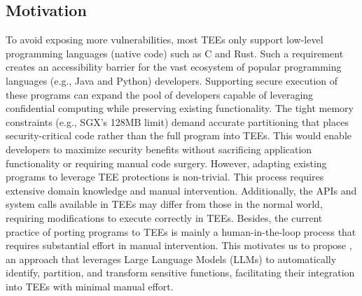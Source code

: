 \subsection{Motivation}
To avoid exposing more vulnerabilities, most TEEs only support low-level programming languages (native code) such as C and Rust. 
Such a requirement creates an accessibility barrier for the vast ecosystem of popular programming languages (e.g., Java and Python) developers. Supporting secure execution of these programs can expand the pool of developers capable of leveraging confidential computing while preserving existing functionality. 
The tight memory constraints (e.g., SGX's 128MB limit) demand accurate partitioning that places security-critical code rather than the full program into TEEs. 
This would enable developers to maximize security benefits without sacrificing application functionality or requiring manual code surgery.
However, adapting existing programs to leverage TEE protections is non-trivial. 
This process requires extensive domain knowledge and manual intervention.
Additionally, the APIs and system calls available in TEEs may differ from those in the normal world, requiring modifications to execute correctly in TEEs.
Besides, the current practice of porting programs to TEEs is mainly a human-in-the-loop process that requires substantial effort in manual intervention. 
This motivates us to propose \system, an approach that leverages Large Language Models (LLMs) to automatically identify, partition, and transform sensitive functions, facilitating their integration into TEEs with minimal manual effort.

